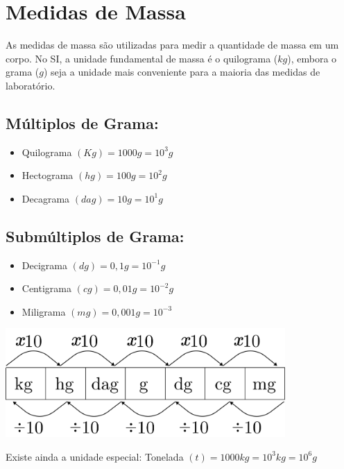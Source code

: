 \section{Medidas de Massa}
As medidas de massa são utilizadas para medir a quantidade
de massa em um corpo. No SI, a unidade fundamental de massa é
o quilograma ($kg$), embora o grama ($g$) seja a unidade mais
conveniente para a maioria das medidas de laboratório.
\begin{multicols}{2}
	\subsection{Múltiplos de Grama:}
		\begin{itemize}
		    \item Quilograma $(Kg) = 1000 g = 10^3 g$
		    \item Hectograma $(hg) = 100 g = 10^2 g$
		    \item Decagrama $(dag) = 10 g = 10^1 g$
		\end{itemize}
	
	\subsection{Submúltiplos de Grama:}
		\begin{itemize}
		    \item Decigrama $(dg) = 0,1 g = 10^{-1} g$
		    \item Centigrama $(cg) = 0,01 g = 10^{-2} g$
		    \item Miligrama $(mg) = 0,001 g = 10^{-3}$
		\end{itemize}
		\columnbreak
     \bigskip
     \noindent   %
     \begin{minipage}{\linewidth}
    \centering 
    \includegraphics[width=0.8\textwidth]{imagens/matematicaBasica/sistemaDeUnidades/MultiplosDeGrama.pdf}
\end{minipage}
   \end{multicols} 
Existe ainda a unidade especial:
Tonelada $(t) = 1000 kg = 10^3 kg = 10^6 g$

